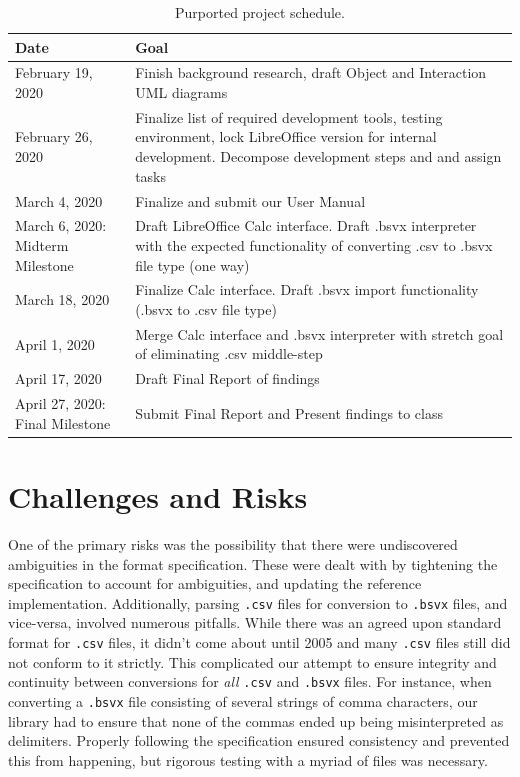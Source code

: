 \documentclass[10pt]{article}
\begin{document}
\begin{table}[H]
\centering
\begin{tabular}{|p{80pt}|p{375pt}|}
\hline
\textbf{Date} & \textbf{Goal} \\ \hline
February 19, 2020 & Finish background research, draft Object and Interaction UML diagrams \\ \hline
February 26, 2020 & Finalize list of required development tools, testing environment, lock LibreOffice version for internal development. Decompose development steps and and assign tasks \\ \hline
March 4, 2020 & Finalize and submit our User Manual \\ \hline
March 6, 2020: Midterm Milestone & Draft LibreOffice Calc interface.
Draft .bsvx interpreter with the expected functionality of converting .csv to .bsvx file type (one way) \\ \hline
March 18, 2020 & Finalize Calc interface. Draft .bsvx import functionality (.bsvx to .csv file type) \\ \hline
April 1, 2020 & Merge Calc interface and .bsvx interpreter with stretch goal of eliminating .csv middle-step \\ \hline
April 17, 2020 & Draft Final Report of findings \\ \hline
April 27, 2020: Final Milestone & Submit Final Report and Present findings to class \\ \hline
\end{tabular}
\caption{Purported project schedule.}
\label{tab:approach_schedule}
\end{table}

\section*{Challenges and Risks}

One of the primary risks was the possibility that there were undiscovered ambiguities in the format specification.
These were dealt with by tightening the specification to account for ambiguities, and updating the reference implementation.
Additionally, parsing \texttt{.csv} files for conversion to \texttt{.bsvx} files, and vice-versa, involved numerous pitfalls.
While there was an agreed upon standard format for \texttt{.csv} files, it didn’t come about until 2005 and many \texttt{.csv} files still did not conform to it strictly.
This complicated our attempt to ensure integrity and continuity between conversions for \textit{all} \texttt{.csv} and \texttt{.bsvx} files.
For instance, when converting a \texttt{.bsvx} file consisting of several strings of comma characters, our library had to ensure that none of the commas ended up being misinterpreted as delimiters.
Properly following the specification ensured consistency and prevented this from happening, but rigorous testing with a myriad of files was necessary.
\end{document}
